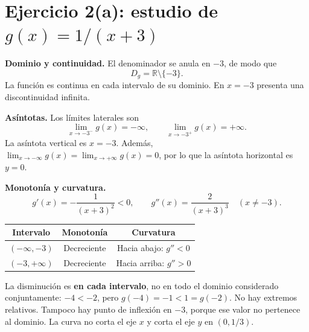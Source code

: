 \documentclass[11pt,a4paper]{article}
\begin{document}
\begin{center}
\end{center}

\clearpage
\section*{Ejercicio 2(a): estudio de \(g(x)=1/(x+3)\)}
\textbf{Dominio y continuidad.}
El denominador se anula en \(-3\), de modo que
\[
D_g=\mathbb{R}\setminus\{-3\}.
\]
La función es continua en cada intervalo de su dominio. En \(x=-3\)
presenta una discontinuidad infinita.

\textbf{Asíntotas.} Los límites laterales son
\[
\lim_{x\to-3^-}g(x)=-\infty,\qquad
\lim_{x\to-3^+}g(x)=+\infty.
\]
La asíntota vertical es \(x=-3\). Además,
\(\lim_{x\to-\infty}g(x)=\lim_{x\to+\infty}g(x)=0\), por lo que la
asíntota horizontal es \(y=0\).

\textbf{Monotonía y curvatura.}
\[
g'(x)=-\frac{1}{(x+3)^2}<0,\qquad
g''(x)=\frac{2}{(x+3)^3}\quad(x\ne-3).
\]
\begin{center}
\begin{tabular}{c|c|c}
Intervalo & Monotonía & Curvatura\\ \hline
\((-\infty,-3)\) & Decreciente & Hacia abajo: \(g''<0\)\\
\((-3,+\infty)\) & Decreciente & Hacia arriba: \(g''>0\)
\end{tabular}
\end{center}
La disminución es \textbf{en cada intervalo}, no en todo el dominio
considerado conjuntamente: \(-4<-2\), pero \(g(-4)=-1<1=g(-2)\).
No hay extremos relativos. Tampoco hay punto de inflexión en \(-3\),
porque ese valor no pertenece al dominio. La curva no corta el eje \(x\)
y corta el eje \(y\) en \((0,1/3)\).
\end{document}
